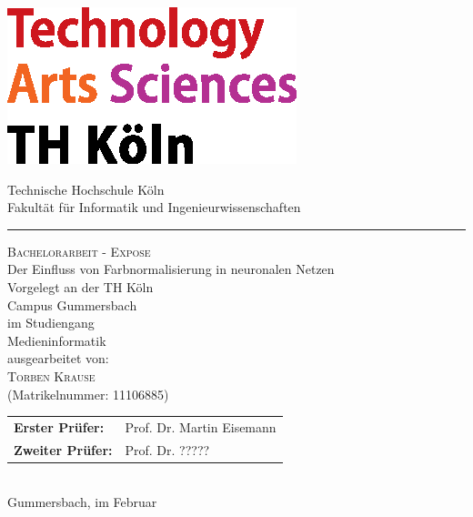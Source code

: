 \documentclass[a4paper,12pt,oneside]{article}
\begin{document}
  
  \pagestyle{empty}
  \begin{titlepage}
    \includegraphics[scale=1.00]{Sources/logo_TH-Koeln_CMYK_22pt}\\
    \begin{center}
      \Large
      Technische Hochschule Köln\\
      Fakultät für Informatik und Ingenieurwissenschaften\\
      \hrule\par\rule{0pt}{2cm} %
      \LARGE
      \textsc{Bachelorarbeit - Expose}\\
      \vspace{1cm} %
      \huge
      Der Einfluss von Farbnormalisierung in neuronalen Netzen\\
      \vspace{1 cm}
      \large
      Vorgelegt an der TH Köln\\
      Campus Gummersbach\\
      im Studiengang\\
      Medieninformatik\\ 
      \vspace{1.0cm}
      ausgearbeitet von:\\
      \textsc{Torben Krause}\\
      (Matrikelnummer: 11106885)\\
      \vspace{1.5cm}
      \begin{tabular}{ll} %
          \textbf{Erster Prüfer:} & Prof. Dr. Martin Eisemann \\
          \textbf{Zweiter Prüfer:} & Prof. Dr. ????? \\
      \end{tabular}
      \vspace{1.5cm}
      \\Gummersbach, im Februar
    \end{center}    
  \end{titlepage}
    
\end{document}
